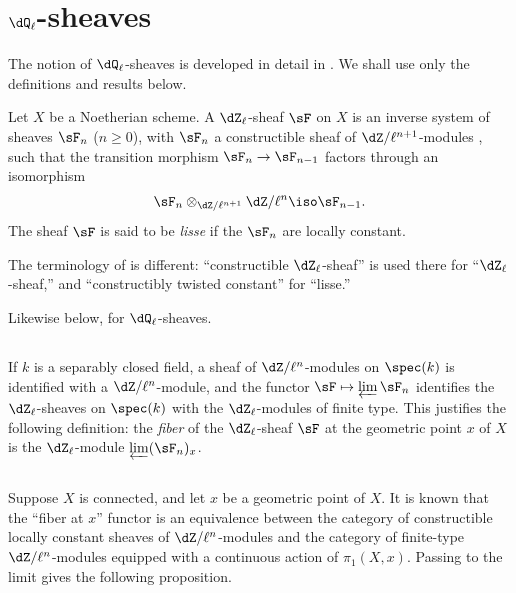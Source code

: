 \section{\texorpdfstring{$\dQ_\ell$}{Ql}-sheaves}\label{II:2}

The notion of $\dQ_\ell$-sheaves is developed in detail in
\cite[V,VI]{sga5}. We shall use only the definitions and results below.






\begin{definition_}\label{II:2-1}
Let $X$ be a Noetherian scheme. A $\dZ_\ell$-sheaf $\sF$ on $X$ is an
inverse system of sheaves $\sF_n$ ($n\geqslant 0$), with $\sF_n$ a
constructible sheaf of $\dZ/\ell^{n+1}$-modules \cite[IX.2]{sga4}, such that
the transition morphism $\sF_n\to\sF_{n-1}$ factors through an isomorphism
\[
  \sF_n\otimes_{\dZ/\ell^{n+1}} \dZ/\ell^n \iso \sF_{n-1}\text{.}
\]
The sheaf $\sF$ is said to be \emph{lisse} if the $\sF_n$ are locally
constant.
\end{definition_}

The terminology of \cite{sga5} is different: ``constructible
$\dZ_\ell$-sheaf'' is used there for ``$\dZ_\ell$-sheaf,'' and
``constructibly twisted constant'' for ``lisse.''

Likewise below, for $\dQ_\ell$-sheaves.






\subsection{}\label{II:2-2}

If $k$ is a separably closed field, a sheaf of $\dZ/\ell^n$-modules on
$\spec(k)$ is identified with a $\dZ/\ell^n$-module, and the functor
$\sF\mapsto \varprojlim \sF_n$ identifies the $\dZ_\ell$-sheaves on
$\spec(k)$ with the $\dZ_\ell$-modules of finite type. This justifies the
following definition: the \emph{fiber} of the $\dZ_\ell$-sheaf $\sF$ at the
geometric point $x$ of $X$ is the $\dZ_\ell$-module
$\varprojlim (\sF_n)_x$.






\subsection{}\label{II:2-3}

Suppose $X$ is connected, and let $x$ be a geometric point of $X$. It is
known that the ``fiber at $x$'' functor is an equivalence between the
category of constructible locally constant sheaves of
$\dZ/\ell^n$-modules and the category of finite-type
$\dZ/\ell^n$-modules equipped with a continuous action of $\pi_1(X,x)$.
Passing to the limit gives the following proposition.






